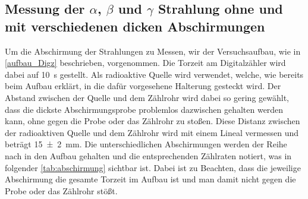 \documentclass[12pt,english,ngerman]{scrartcl}
\begin{document}
\subsection{Messung der \texorpdfstring{$\alpha$}{alpha}, \texorpdfstring{$\beta$}{beta} und
	\texorpdfstring{$\gamma$}{gamma} Strahlung ohne und mit verschiedenen dicken Abschirmungen}

Um die Abschirmung der Strahlungen zu Messen, wir der Versuchsaufbau, wie in
\autoref{aufbau_Digz} beschrieben, vorgenommen. Die Torzeit am Digitalzähler
wird dabei auf \SI{10}{\second} gestellt. Als radioaktive Quelle wird
 verwendet, welche, wie bereits beim Aufbau erklärt, in die
dafür vorgesehene Halterung gesteckt wird. Der Abstand zwischen der Quelle und
dem Zählrohr wird dabei so gering gewählt, dass die dickste Abschirmungsprobe
problemlos dazwischen gehalten werden kann, ohne gegen die Probe oder das
Zählrohr zu stoßen. Diese Distanz zwischen der radioaktiven Quelle und dem
Zählrohr wird mit einem Lineal vermessen und beträgt \SI{15(2)}{\mm}. Die
unterschiedlichen Abschirmungen werden der Reihe nach in den Aufbau gehalten
und die entsprechenden Zählraten notiert, was in folgender
\autoref{tab:abschirmung} sichtbar ist. Dabei ist zu Beachten, dass die
jeweilige Abschirmung die gesamte Torzeit im Aufbau ist und man damit nicht
gegen die Probe oder das Zählrohr stößt.

\begin{table}[H]
	\caption[Erhaltene Zählraten bei verschiedenen Abschirmungsmaterialien]{Erhaltene Zählraten bei
		verschiedenen Abschirmungsmaterialien bei einer Torzeit von \SI{10}{\second} und einem
		Abstand der radioaktiven Quelle von \SI{15(2)}{\mm}. Zählraten sind exakt.\\
		\(z_{Luft} \dots\) erhaltene Zählrate ohne Abschirmung \\
		\(z_{\mathrm{Papier}} \dots\) erhaltene Zählrate mit einem Blatt Papier als Abschirmung \\
		\(z_{\mathrm{Lineal}} \dots\) erhaltene Zählrate mit einem Lineal als Abschirmung, Dicke = \SI{2.1(0.05)}{\mm}\\
		\(z_{\mathrm{CD}} \dots\) erhaltene Zählrate mit einer CD und zugehörigen Soulcase als Abschirmung \\
		\(z_{\mathrm{Alu \num{0.4}}} \dots\) erhaltene Zählrate mit mit einem Aluminiumblech als Abschirmung, Dicke = \SI{0.4(0.05)}{\mm}\\
		\(z_{\mathrm{Alu \num{0.8}}} \dots\) erhaltene Zählrate mit mit einem Aluminiumblech als Abschirmung, Dicke = \SI{0.8(0.05)}{\mm}\\
		\(z_{\mathrm{Alu \num{4}}} \dots\) erhaltene Zählrate mit mit einem Aluminiumblech als Abschirmung, Dicke = \SI{4.0(0.05)}{\mm}\\
	}
	\label{tab:abschirmung}
	\begin{center}
		
	\end{center}
\end{table}
\end{document}
